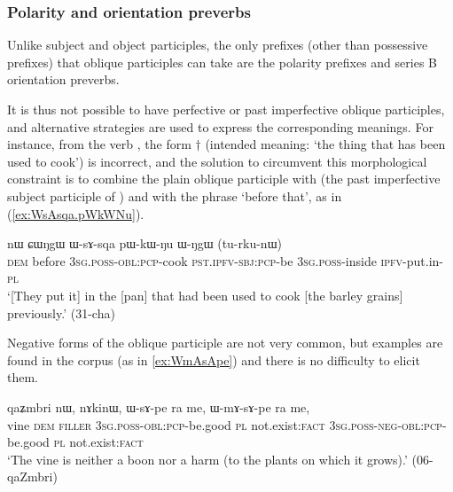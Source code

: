 \subsubsection{Polarity and orientation preverbs} \label{sec:oblique.participle.orientation}
Unlike subject and object participles, the only prefixes (other than possessive prefixes) that oblique participles can take are the polarity prefixes and series B orientation preverbs.

It is thus not possible to have perfective or past imperfective oblique participles, and alternative strategies are used to express the corresponding meanings. For instance, from the verb , the form $\dagger$ (intended meaning: `the thing that has been used to cook') is incorrect, and the solution to circumvent this morphological constraint is to combine the plain oblique participle  with  (the past imperfective subject participle of ) and with the phrase  `before that', as in (\ref{ex:WsAsqa.pWkWNu}).

\begin{exe}
\ex \label{ex:WsAsqa.pWkWNu}
\gll  nɯ ɕɯŋgɯ ɯ-sɤ-sqa pɯ-kɯ-ŋu ɯ-ŋgɯ (tu-rku-nɯ) \\
\textsc{dem} before \textsc{3sg}.\textsc{poss}-\textsc{obl}:\textsc{pcp}-cook \textsc{pst}.\textsc{ipfv}-\textsc{sbj}:\textsc{pcp}-be \textsc{3sg}.\textsc{poss}-inside \textsc{ipfv}-put.in-\textsc{pl} \\
\glt `[They put it] in the [pan] that had been used to cook [the barley grains] previously.' (31-cha) 
\end{exe}

Negative forms of the oblique participle are not very common, but examples are found in the corpus (as in \ref{ex:WmAsApe}) and there is no difficulty to elicit them.

\begin{exe}
\ex \label{ex:WmAsApe}
\gll  qaʑmbri nɯ, nɤkinɯ, ɯ-sɤ-pe ra me, ɯ-mɤ-sɤ-pe ra me, \\
vine \textsc{dem} \textsc{filler} \textsc{3sg}.\textsc{poss}-\textsc{obl}:\textsc{pcp}-be.good \textsc{pl} not.exist:\textsc{fact}  \textsc{3sg}.\textsc{poss}-\textsc{neg}-\textsc{obl}:\textsc{pcp}-be.good \textsc{pl} not.exist:\textsc{fact} \\
\glt `The vine is neither a boon nor a harm (to the plants on which it grows).' (06-qaZmbri) 	
\end{exe}


